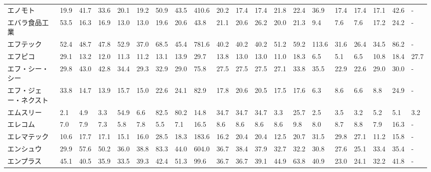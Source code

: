 \begin{longtable}[c]{lp{3mm}p{3mm}p{3mm}p{3mm}p{3mm}p{3mm}p{3mm}p{3mm}p{3mm}p{3mm}p{3mm}p{3mm}p{3mm}p{3mm}p{3mm}p{3mm}p{3mm}p{3mm}p{3mm}}
エノモト            &   19.9 &   41.7 &      33.6 &      20.1 &       19.2 &    50.9 &    43.5 &    410.6 &    20.2 &    17.4 &   17.4 &   21.8 &    22.4 &    36.9 &    17.4 &   17.4 &   17.1 &    42.6 &      - \\
エバラ食品工業         &   53.5 &   16.3 &      16.9 &      13.0 &       13.0 &    19.6 &    20.6 &     43.8 &    21.1 &    20.6 &   26.2 &   20.0 &    21.3 &     9.4 &     7.6 &    7.6 &   17.2 &    24.2 &      - \\
エフテック           &   52.4 &   48.7 &      47.8 &      52.9 &       37.0 &    68.5 &    45.4 &    781.6 &    40.2 &    40.2 &   40.2 &   51.2 &    59.2 &   113.6 &    31.6 &   26.4 &   34.5 &    86.2 &      - \\
エフピコ            &   29.1 &   13.2 &      12.0 &      11.3 &       11.2 &    13.1 &    13.9 &     29.7 &    13.8 &    13.0 &   13.0 &   11.0 &    18.3 &     6.5 &     5.1 &    6.5 &   10.8 &    18.4 &   27.7 \\
エフ・シー・シー        &   29.8 &   43.0 &      42.8 &      34.4 &       29.3 &    32.9 &    29.0 &     75.8 &    27.5 &    27.5 &   27.5 &   27.1 &    33.8 &    35.5 &    22.9 &   22.6 &   29.0 &    30.0 &      - \\
エフ・ジェー・ネクスト     &   33.8 &   14.7 &      13.9 &      15.7 &       15.0 &    22.6 &    24.1 &     82.9 &    17.8 &    20.6 &   20.5 &   17.5 &    17.6 &     6.3 &     8.6 &    6.6 &    8.8 &    24.9 &      - \\
エムスリー           &    2.1 &    4.9 &       3.3 &      54.9 &        6.6 &    82.5 &    80.2 &     14.8 &    34.7 &    34.7 &   34.7 &    3.3 &    25.7 &     2.5 &     3.5 &    3.2 &    5.2 &     5.1 &    3.2 \\
エレコム            &    7.0 &    7.9 &       7.3 &       5.8 &        7.8 &     5.5 &     7.1 &     16.5 &     8.6 &     8.6 &    8.6 &    8.6 &     9.8 &     8.0 &     8.7 &    8.8 &    7.9 &    16.3 &      - \\
エレマテック          &   10.6 &   17.7 &      17.1 &      15.1 &       16.0 &    28.5 &    18.3 &    183.6 &    16.2 &    20.4 &   20.4 &   12.5 &    20.7 &    31.5 &    29.8 &   27.1 &   11.2 &    15.8 &      - \\
エンシュウ           &   29.9 &   57.6 &      50.2 &      36.0 &       38.8 &    83.3 &    44.0 &    604.0 &    36.7 &    38.4 &   37.9 &   32.7 &    32.2 &    30.8 &    27.6 &   25.1 &   33.4 &    35.4 &      - \\
エンプラス           &   45.1 &   40.5 &      35.9 &      33.5 &       39.3 &    42.4 &    51.3 &     99.6 &    36.7 &    36.7 &   39.1 &   44.9 &    63.8 &    40.9 &    23.0 &   24.1 &   32.2 &    41.8 &      - \\

\end{longtable}
